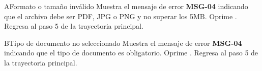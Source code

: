 \begin{UCtrayectoriaA}{A}{Formato o tamaño inválido}
	\UCpaso Muestra el mensaje de error \textbf{MSG-04} indicando que el archivo debe ser PDF, JPG o PNG y no superar los 5MB.
	\UCpaso[\UCactor] Oprime .
	\UCpaso Regresa al paso 5 de la trayectoria principal.
\end{UCtrayectoriaA}

\begin{UCtrayectoriaA}{B}{Tipo de documento no seleccionado}
	\UCpaso Muestra el mensaje de error \textbf{MSG-04} indicando que el tipo de documento es obligatorio.
	\UCpaso[\UCactor] Oprime .
	\UCpaso Regresa al paso 5 de la trayectoria principal.
\end{UCtrayectoriaA}

